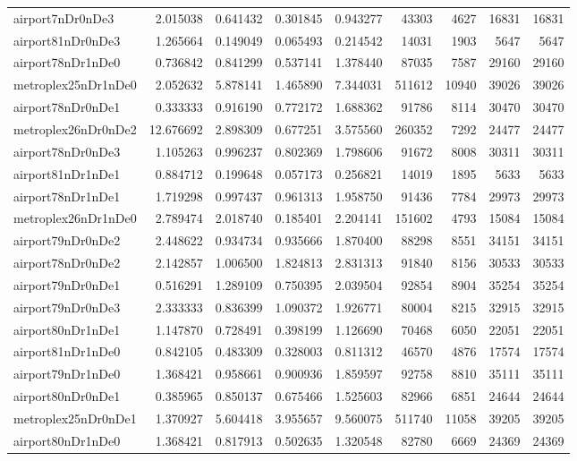 \begin{longtable}{|l|r|r|r|r|r|r|r|r|}
airport7nDr0nDe3 & 2.015038 & 0.641432 & 0.301845 & 0.943277 & 43303 & 4627 & 16831 & 16831 \\
airport81nDr0nDe3 & 1.265664 & 0.149049 & 0.065493 & 0.214542 & 14031 & 1903 & 5647 & 5647 \\
airport78nDr1nDe0 & 0.736842 & 0.841299 & 0.537141 & 1.378440 & 87035 & 7587 & 29160 & 29160 \\
metroplex25nDr1nDe0 & 2.052632 & 5.878141 & 1.465890 & 7.344031 & 511612 & 10940 & 39026 & 39026 \\
airport78nDr0nDe1 & 0.333333 & 0.916190 & 0.772172 & 1.688362 & 91786 & 8114 & 30470 & 30470 \\
metroplex26nDr0nDe2 & 12.676692 & 2.898309 & 0.677251 & 3.575560 & 260352 & 7292 & 24477 & 24477 \\
airport78nDr0nDe3 & 1.105263 & 0.996237 & 0.802369 & 1.798606 & 91672 & 8008 & 30311 & 30311 \\
airport81nDr1nDe1 & 0.884712 & 0.199648 & 0.057173 & 0.256821 & 14019 & 1895 & 5633 & 5633 \\
airport78nDr1nDe1 & 1.719298 & 0.997437 & 0.961313 & 1.958750 & 91436 & 7784 & 29973 & 29973 \\
metroplex26nDr1nDe0 & 2.789474 & 2.018740 & 0.185401 & 2.204141 & 151602 & 4793 & 15084 & 15084 \\
airport79nDr0nDe2 & 2.448622 & 0.934734 & 0.935666 & 1.870400 & 88298 & 8551 & 34151 & 34151 \\
airport78nDr0nDe2 & 2.142857 & 1.006500 & 1.824813 & 2.831313 & 91840 & 8156 & 30533 & 30533 \\
airport79nDr0nDe1 & 0.516291 & 1.289109 & 0.750395 & 2.039504 & 92854 & 8904 & 35254 & 35254 \\
airport79nDr0nDe3 & 2.333333 & 0.836399 & 1.090372 & 1.926771 & 80004 & 8215 & 32915 & 32915 \\
airport80nDr1nDe1 & 1.147870 & 0.728491 & 0.398199 & 1.126690 & 70468 & 6050 & 22051 & 22051 \\
airport81nDr1nDe0 & 0.842105 & 0.483309 & 0.328003 & 0.811312 & 46570 & 4876 & 17574 & 17574 \\
airport79nDr1nDe0 & 1.368421 & 0.958661 & 0.900936 & 1.859597 & 92758 & 8810 & 35111 & 35111 \\
airport80nDr0nDe1 & 0.385965 & 0.850137 & 0.675466 & 1.525603 & 82966 & 6851 & 24644 & 24644 \\
metroplex25nDr0nDe1 & 1.370927 & 5.604418 & 3.955657 & 9.560075 & 511740 & 11058 & 39205 & 39205 \\
airport80nDr1nDe0 & 1.368421 & 0.817913 & 0.502635 & 1.320548 & 82780 & 6669 & 24369 & 24369 \\

\end{longtable}
